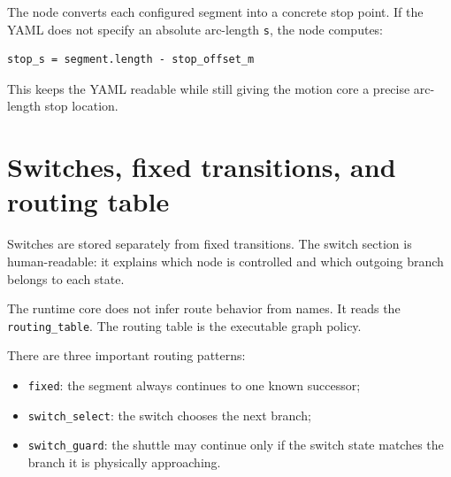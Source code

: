 \documentclass[12pt,a4paper]{report}
\newcommand{\codenext}[1]{\par\Needspace{#1\baselineskip}}
\begin{document}
The node converts each configured segment into a concrete stop point. If the
YAML does not specify an absolute arc-length \texttt{s}, the node computes:

\begin{lstlisting}[style=terminalcode]
stop_s = segment.length - stop_offset_m
\end{lstlisting}

\codenext{32}


This keeps the YAML readable while still giving the motion core a precise
arc-length stop location.

\section{Switches, fixed transitions, and routing table}

Switches are stored separately from fixed transitions. The switch section is
human-readable: it explains which node is controlled and which outgoing branch
belongs to each state.

\codenext{42}


The runtime core does not infer route behavior from names. It reads the
\texttt{routing\_table}. The routing table is the executable graph policy.

\codenext{34}


There are three important routing patterns:

\begin{itemize}
\item \texttt{fixed}: the segment always continues to one known successor;
\item \texttt{switch\_select}: the switch chooses the next branch;
\item \texttt{switch\_guard}: the shuttle may continue only if the switch state
matches the branch it is physically approaching.
\end{itemize}
\end{document}
